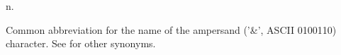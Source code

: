  n.

Common abbreviation for the name of the ampersand ('\&', ASCII 0100110) character. See  for other synonyms.


